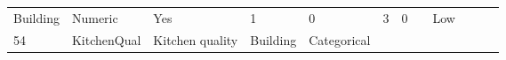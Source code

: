 \documentclass[11pt]{article}
\begin{document}
\begin{longtable}[]{@{}llllllllllll@{}}
\begin{minipage}[t]{0.04\columnwidth}
Building\strut
\end{minipage} & \begin{minipage}[t]{0.04\columnwidth}\raggedright\strut
Numeric\strut
\end{minipage} & \begin{minipage}[t]{0.04\columnwidth}\raggedright\strut
Yes\strut
\end{minipage} & \begin{minipage}[t]{0.04\columnwidth}\raggedright\strut
1\strut
\end{minipage} & \begin{minipage}[t]{0.04\columnwidth}\raggedright\strut
0\strut
\end{minipage} & \begin{minipage}[t]{0.04\columnwidth}\raggedright\strut
3\strut
\end{minipage} & \begin{minipage}[t]{0.04\columnwidth}\raggedright\strut
0\strut
\end{minipage} & \begin{minipage}[t]{0.04\columnwidth}\raggedright\strut
\strut
\end{minipage} & \begin{minipage}[t]{0.04\columnwidth}\raggedright\strut
Low\strut
\end{minipage}\tabularnewline
\begin{minipage}[t]{0.04\columnwidth}\raggedright\strut
54\strut
\end{minipage} & \begin{minipage}[t]{0.04\columnwidth}\raggedright\strut
KitchenQual\strut
\end{minipage} & \begin{minipage}[t]{0.04\columnwidth}\raggedright\strut
Kitchen quality\strut
\end{minipage} & \begin{minipage}[t]{0.04\columnwidth}\raggedright\strut
Building\strut
\end{minipage} & \begin{minipage}[t]{0.04\columnwidth}\raggedright\strut
Categorical\strut
\end{minipage} & \begin{minipage}[t]{0.04\columnwidth}\raggedright\strut
\strut
\end{minipage} & \begin{minipage}[t]{0.04\columnwidth}\raggedright\strut
\strut
\end{minipage} & \begin{minipage}[t]{0.04\columnwidth}\raggedright\strut

\end{minipage}
\end{longtable}
\end{document}
